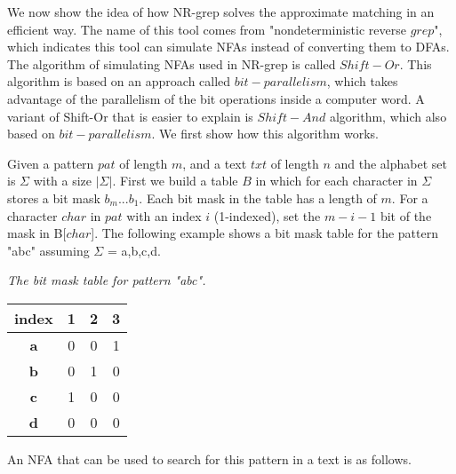 We now show the idea of how NR-grep solves the approximate matching in an efficient way. The name of this tool comes from "nondeterministic reverse $grep$", which indicates this tool can simulate NFAs instead of converting them to DFAs. The algorithm of  simulating NFAs used in NR-grep is called $Shift-Or$. This algorithm is based on an approach called $bit-parallelism$, which takes advantage of the parallelism of the bit operations inside a computer word. A variant of Shift-Or that is easier to explain is $Shift-And$ algorithm, which also based on $bit-parallelism$. We first show how this algorithm works. 

Given a pattern $pat$ of length $m$,  and a text $txt$ of length $n$ and the alphabet set is $\Sigma$ with a size $|\Sigma|$. First we build a table $B$ in which for each character in $\Sigma$ stores a bit mask $b_m...b_1$. Each bit mask in the table has a length of $m$. For a character $char$ in $pat$ with an index $i$ (1-indexed), set the $m-i-1$ bit of the mask in B[$char$]. The following example shows a bit mask table for the pattern "abc" assuming $\Sigma$ = {a,b,c,d}.


\begin{example}\emph{The bit mask table for pattern "abc".}

\begin{table}[H]
	\centering
	\begin{tabular}{|c|c|c|c|}
		\hline
		index      & 1                        & 2                        & 3                        \\ \hline
		\textbf{a} & 0                        & 0                        & {\color[HTML]{3531FF} 1} \\ \hline
		\textbf{b} & 0                        & {\color[HTML]{3531FF} 1} & 0                        \\ \hline
		\textbf{c} & {\color[HTML]{3531FF} 1} & 0                        & 0                        \\ \hline
		\textbf{d} & 0                        & 0                        & 0                        \\ \hline
	\end{tabular}
	\label{table-bitmask}
\end{table}
\end{example}

An NFA that can be used to search for this pattern in a text is as follows.

